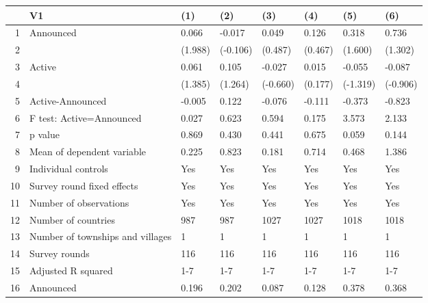 \begin{table}[ht]
\centering
\begin{tabular}{rlllllll}
  \hline
 & V1 & (1) & (2) & (3) & (4) & (5) & (6) \\ 
  \hline
1 & Announced & 0.066 & -0.017 & 0.049 & 0.126 & 0.318 & 0.736 \\ 
  2 &  & (1.988) & (-0.106) & (0.487) & (0.467) & (1.600) & (1.302) \\ 
  3 & Active & 0.061 & 0.105 & -0.027 & 0.015 & -0.055 & -0.087 \\ 
  4 &  & (1.385) & (1.264) & (-0.660) & (0.177) & (-1.319) & (-0.906) \\ 
  5 & Active-Announced & -0.005 & 0.122 & -0.076 & -0.111 & -0.373 & -0.823 \\ 
  6 & F test: Active=Announced & 0.027 & 0.623 & 0.594 & 0.175 & 3.573 & 2.133 \\ 
  7 & p value & 0.869 & 0.430 & 0.441 & 0.675 & 0.059 & 0.144 \\ 
  8 & Mean of dependent variable & 0.225 & 0.823 & 0.181 & 0.714 & 0.468 & 1.386 \\ 
  9 & Individual controls & Yes & Yes & Yes & Yes & Yes & Yes \\ 
  10 & Survey round fixed effects & Yes & Yes & Yes & Yes & Yes & Yes \\ 
  11 & Number of observations & Yes & Yes & Yes & Yes & Yes & Yes \\ 
  12 & Number of countries & 987 & 987 & 1027 & 1027 & 1018 & 1018 \\ 
  13 & Number of townships and villages & 1 & 1 & 1 & 1 & 1 & 1 \\ 
  14 & Survey rounds & 116 & 116 & 116 & 116 & 116 & 116 \\ 
  15 & Adjusted R squared & 1-7 & 1-7 & 1-7 & 1-7 & 1-7 & 1-7 \\ 
  16 & Announced & 0.196 & 0.202 & 0.087 & 0.128 & 0.378 & 0.368 \\ 
   \hline
\end{tabular}
\end{table}
